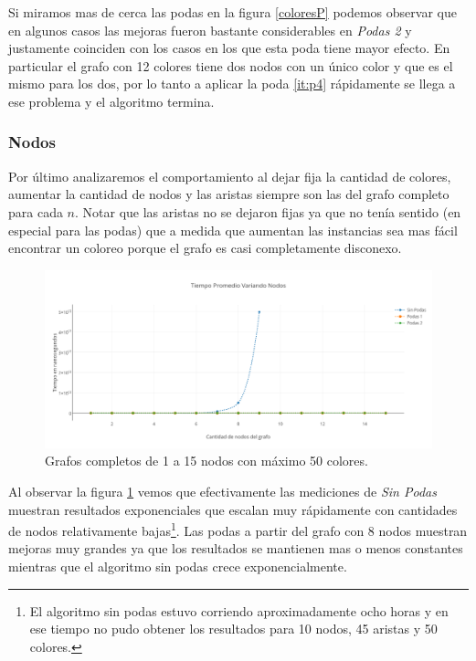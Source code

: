 Si miramos mas de cerca las podas en la figura \ref{coloresP} podemos observar que en algunos casos las mejoras fueron bastante considerables en \emph{Podas 2} y justamente coinciden con los casos en los que esta poda tiene mayor efecto. En particular el grafo con 12 colores tiene dos nodos con un único color y que es el mismo para los dos, por lo tanto a aplicar la poda \ref{it:p4} rápidamente se llega a ese problema y el algoritmo termina.\\

\subsubsection{Nodos}

Por último analizaremos el comportamiento al dejar fija la cantidad de colores, aumentar la cantidad de nodos y las aristas siempre son las del grafo completo para cada $n$. Notar que las aristas no se dejaron fijas ya que no tenía sentido (en especial para las podas) que a medida que aumentan las instancias sea mas fácil encontrar un coloreo porque el grafo es casi completamente disconexo.

 \begin{figure}[H]
	\centering
 	\includegraphics[scale=0.45]{imagenes/Ej2/Nodos.png}
	\caption{Grafos completos de 1 a 15 nodos con máximo 50 colores.}
	\label{nodos}
 \end{figure}

Al observar la figura \ref{nodos} vemos que efectivamente las mediciones de \emph{Sin Podas} muestran resultados exponenciales que escalan muy rápidamente con cantidades de nodos relativamente bajas\footnote{El algoritmo sin podas estuvo corriendo aproximadamente ocho horas y en ese tiempo no pudo obtener los resultados para 10 nodos, 45 aristas y 50 colores.}. Las podas a partir del grafo con 8 nodos muestran mejoras muy grandes ya que los resultados se mantienen mas o menos constantes mientras que el algoritmo sin podas crece exponencialmente.


